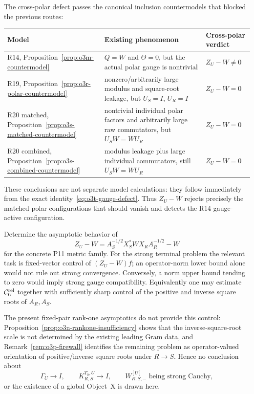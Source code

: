 \begin{remark}
\label{rem:o3t-countermodels}
The cross-polar defect passes the canonical inclusion countermodels that blocked the
previous routes:
\begin{center}
\begin{tabular}{@{}p{}p{}p{}@{}}
\toprule
Model & Existing phenomenon & Cross-polar verdict \\
\midrule
R14, Proposition~\ref{prop:o3m-countermodel}
& $Q=W$ and $\Theta=0$, but the actual polar gauge is nontrivial
& $Z_U-W\ne0$ \\
R19, Proposition~\ref{prop:o3r-polar-countermodel}
& nonzero/arbitrarily large modulus and square-root leakage, but $U_S=I$, $U_R=I$
& $Z_U-W=0$ \\
R20 matched, Proposition~\ref{prop:o3s-matched-countermodel}
& nontrivial individual polar factors and arbitrarily large raw commutators, but $U_SW=WU_R$
& $Z_U-W=0$ \\
R20 combined, Proposition~\ref{prop:o3s-combined-countermodel}
& modulus leakage plus large individual commutators, still $U_SW=WU_R$
& $Z_U-W=0$ \\
\bottomrule
\end{tabular}
\end{center}
These conclusions are not separate model calculations: they follow immediately from
the exact identity~\eqref{eq:o3t-gauge-defect}.  Thus $Z_U-W$ rejects precisely the
matched polar configurations that should vanish and detects the R14 gauge-active
configuration.
\end{remark}

\begin{openproblem}
\label{open:o3t-crosspolar}
Determine the asymptotic behavior of
\[
 Z_U-W
 =A_S^{-1/2}X_S^*WX_RA_R^{-1/2}-W
\]
for the concrete P11 metric family.  For the strong terminal problem the relevant task
is fixed-vector control of $(Z_U-W)f$; an operator-norm lower bound alone would not rule
out strong convergence.  Conversely, a norm upper bound tending to zero would imply
strong gauge compatibility.  Equivalently one may estimate
$\mathcal C_U^{\rm rel}$ together with sufficiently sharp control of the positive and
inverse square roots of $A_R,A_S$.

The present fixed-pair rank-one asymptotics do not provide this control:
Proposition~\ref{prop:o3n-rankone-insufficiency} shows that the inverse-square-root scale
is not determined by the existing leading Gram data, and Remark~\ref{rem:o3p-firewall}
identifies the remaining problem as operator-valued orientation of positive/inverse
square roots under $R\to S$.  Hence no conclusion about
\[
 \Gamma_U\to I,
 \qquad
 K_{R,S}^{T_0,U}\to I,
 \qquad
 W_{R,S,-}^{[U]}\text{ being strong Cauchy},
\]
or the existence of a global Object~X is drawn here.
\end{openproblem}
